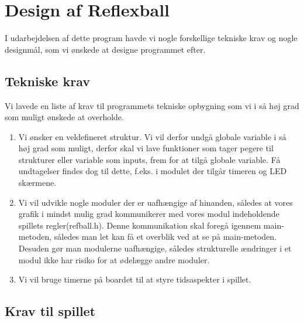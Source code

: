 \section{Design af Reflexball}
I udarbejdelsen af dette program havde vi nogle forskellige tekniske krav og nogle designmål, som vi ønskede at designe programmet efter.
\subsection{Tekniske krav}
Vi lavede en liste af krav til programmets tekniske opbygning som vi i så høj grad som muligt ønskede at overholde. 
\begin{enumerate}
\item Vi ønsker en veldefineret struktur. Vi vil derfor undgå globale variable i så høj grad som muligt, derfor skal vi lave funktioner som tager pegere til strukturer eller variable som inputs, frem for at tilgå globale variable. Få undtagelser findes dog til dette, f.eks. i modulet der tilgår timeren og LED skærmene.
\item Vi vil udvikle nogle moduler  der er uafhængige af hinanden, således at vores grafik i mindst mulig grad kommunikerer med vores modul indeholdende spillets regler(refball.h). Denne kommunikation skal foregå igennem main-metoden, således man let kan få et overblik ved at se på main-metoden. Desuden gør man modulerne uafhængige, således strukturelle ændringer i et modul ikke har risiko for at ødelægge andre moduler.
\item Vi vil bruge timerne på boardet til at styre tidsaspekter i spillet.
	
\end{enumerate}


\subsection{Krav til spillet}
